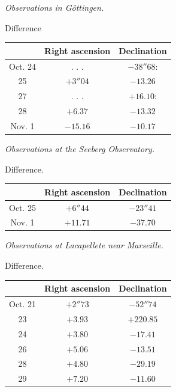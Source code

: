 \medskip
{}\noindent\emph{Observations in Göttingen.} 

\begin{center}
Difference

\fontsize{10}{12}\selectfont\setlength{\tabcolsep}{7pt}\renewcommand{\arraystretch}{1.15}\begin{tabular}{|c|c|c|}
\hline
 & Right ascension & Declination \\
\hline
Oct. 24 & . . . & $-38''68$: \\
25 & $+3''04$ & $-13.26$ \\
27 & . . . & $+16.10$: \\
28 & $+6.37$ & $-13.32$ \\
Nov. 1 & $-15.16$ & $-10.17$ \\
\hline
\end{tabular}
\end{center}

\noindent\emph{Observations at the Seeberg Observatory.}

\begin{center}
Difference.

\fontsize{10}{12}\selectfont\setlength{\tabcolsep}{7pt}\renewcommand{\arraystretch}{1.15}\begin{tabular}{|c|c|c|}
\hline
 & Right ascension & Declination \\
\hline
Oct. 25 & $+6''44$ & $-23''41$ \\
Nov. 1 & $+11.71$ & $-37.70$ \\
\hline
\end{tabular}
\end{center}

\medskip
{}\noindent\emph{Observations at Lacapellete near Marseille.}

\begin{center}
Difference.

\fontsize{10}{12}\selectfont\setlength{\tabcolsep}{7pt}\renewcommand{\arraystretch}{1.15}\begin{tabular}{|c|c|c|}
\hline
 & Right ascension & Declination \\
\hline
Oct. 21 & $+2''73$ & $-52''74$ \\
23 & $+3.93$ & $+220.85$ \\
24 & $+3.80$ & $-17.41$ \\
26 & $+5.06$ & $-13.51$ \\
28 & $+4.80$ & $-29.19$ \\
29 & $+7.20$ & $-11.60$ \\
\hline
\end{tabular}
\end{center}

